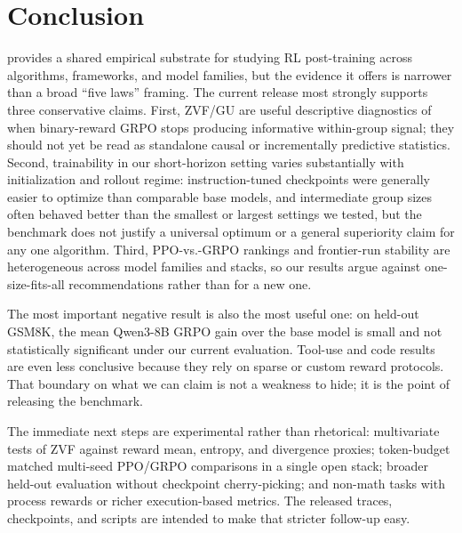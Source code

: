 \section{Conclusion}
\label{sec:conclusion}

\ours{} provides a shared empirical substrate for studying RL post-training
across algorithms, frameworks, and model families, but the evidence it offers
is narrower than a broad ``five laws'' framing. The current release most
strongly supports three conservative claims. First, ZVF/GU are useful
descriptive diagnostics of when binary-reward GRPO stops producing informative
within-group signal; they should not yet be read as standalone causal or
incrementally predictive statistics. Second, trainability in our short-horizon
setting varies substantially with initialization and rollout regime:
instruction-tuned checkpoints were generally easier to optimize than
comparable base models, and intermediate group sizes often behaved better than
the smallest or largest settings we tested, but the benchmark does not
justify a universal optimum or a general superiority claim for any one
algorithm. Third, PPO-vs.-GRPO rankings and frontier-run stability are
heterogeneous across model families and stacks, so our results argue against
one-size-fits-all recommendations rather than for a new one.

The most important negative result is also the most useful one: on held-out
GSM8K, the mean Qwen3-8B GRPO gain over the base model is small and not
statistically significant under our current evaluation. Tool-use and code
results are even less conclusive because they rely on sparse or custom reward
protocols. That boundary on what we can claim is not a weakness to hide; it is
the point of releasing the benchmark.

The immediate next steps are experimental rather than rhetorical: multivariate
tests of ZVF against reward mean, entropy, and divergence proxies; token-budget
matched multi-seed PPO/GRPO comparisons in a single open stack; broader
held-out evaluation without checkpoint cherry-picking; and non-math tasks with
process rewards or richer execution-based metrics. The released traces,
checkpoints, and scripts are intended to make that stricter follow-up easy.
